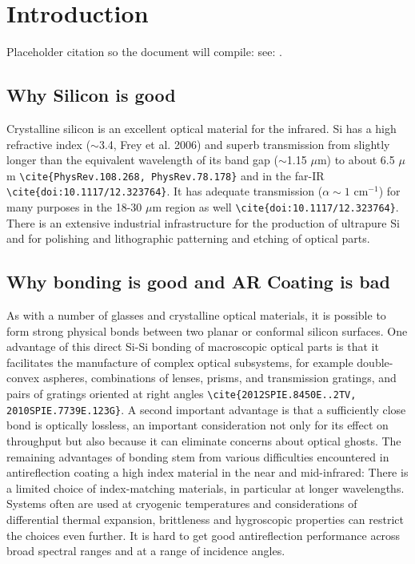 \documentclass[osajnl,preprint,showpacs,superscriptaddress,12pt]{revtex4-1} %
\begin{document}
\section{Introduction}

Placeholder citation so the document will compile: see: \cite{2012SPIE.8450E..2TV, 2010SPIE.7739E.123G}.


\subsection{Why Silicon is good}
Crystalline silicon is an excellent optical material for the infrared. Si has a high refractive index ($\sim$3.4, Frey et al. 2006) and superb transmission from slightly longer than the equivalent wavelength of its band gap ($\sim$1.15 $\mu$m) to about 6.5 $\mu$m \verb|\cite{PhysRev.108.268, PhysRev.78.178}| and in the far-IR \verb|\cite{doi:10.1117/12.323764}|.  It has adequate transmission  ($\alpha \sim 1$ cm$^{-1}$) for many purposes in the 18-30 $\mu$m region as well \verb|\cite{doi:10.1117/12.323764}|.  There is an extensive industrial infrastructure for the production of ultrapure Si and for polishing and lithographic patterning and etching of optical parts.  

\subsection{Why bonding is good and AR Coating is bad}
As with a number of glasses and crystalline optical materials, it is possible to form strong physical bonds between two planar or conformal silicon surfaces.  One advantage of this direct Si-Si bonding of macroscopic optical parts is that it facilitates the manufacture of complex optical subsystems, for example double-convex aspheres, combinations of lenses, prisms, and transmission gratings, and pairs of gratings oriented at right angles \verb|\cite{2012SPIE.8450E..2TV, 2010SPIE.7739E.123G}|.  A second important advantage is that a sufficiently close bond is optically lossless, an important consideration not only for its effect on throughput but also because it can eliminate concerns about optical ghosts.  The remaining advantages of bonding stem from various difficulties encountered in antireflection coating a high index material in the near and mid-infrared:  There is a limited choice of index-matching materials, in particular at longer wavelengths.  Systems often are used at cryogenic temperatures and considerations of differential thermal expansion, brittleness and hygroscopic properties can restrict the choices even further. It is hard to get good antireflection performance across broad spectral ranges and at a range of incidence angles. 
\end{document}
